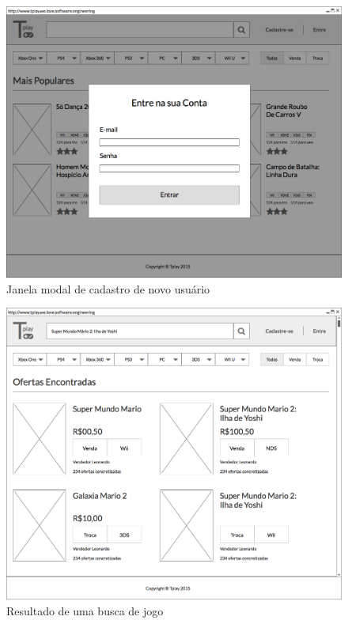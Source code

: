 \documentclass[a4paper,11pt]{article}
\begin{document}
\begin{figure}[!H]
    		\centering
        	\includegraphics[width=\textwidth,height=\dimexpr\textheight-3\baselineskip\relax,keepaspectratio]{Login.png}
        	\caption{Janela modal de cadastro de novo usuário}
     		\label{login}
\end{figure}

\begin{figure}[!H]
    		\centering
        	\includegraphics[width=\textwidth,height=\dimexpr\textheight-3\baselineskip\relax,keepaspectratio]{Busca.png}
        	\caption{Resultado de uma busca de jogo}
     		\label{busca}
\end{figure}
\end{document}
